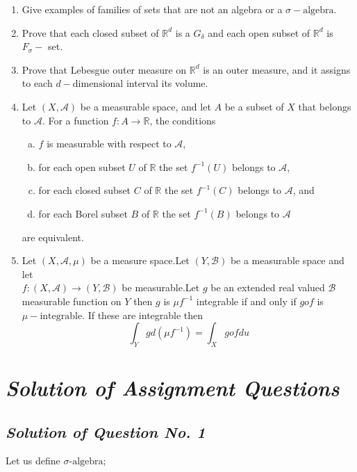 \documentclass[12pt, a4paper]{article} %
\begin{document}
\begin{enumerate}
    \item Give examples of families of sets that are not an algebra or a $\sigma-\mbox{algebra}$.
    \item Prove that each closed subset of $\mathbb{R}^d$ is a $G_{\delta}$ and each open subset of $\mathbb{R}^d$ is $F_{\sigma} - $ set.
    \item Prove that Lebesgue outer measure on $\mathbb{R}^d$ is an outer measure, and it assigns to each $d-\mbox{dimensional}$ interval its volume.
    \item Let $(X, \mathscr{A})$ be a measurable space, and let $A$ be a subset of $X$ that belongs to $\mathscr{A}$. For a function $f:A \to \mathbb{R}$, the conditions 
    \begin{enumerate}[(a)]
        \item $f$ is measurable with respect to $\mathscr{A}$,
        \item for each open subset $U$ of $\mathbb{R}$ the set $f^{-1}(U)$ belongs to $\mathscr{A}$,
        \item for each closed subset $C$ of $\mathbb{R}$ the set $f^{-1}(C)$ belongs to $\mathscr{A}$, and
        \item for each Borel subset $B$ of $\mathbb{R}$ the set $f^{-1}(B)$ belongs to $\mathscr{A}$
    \end{enumerate}
    are equivalent.
    \item Let $(X, \mathscr{A}, \mu)$ be a measure space.Let $(Y, \mathscr{B})$ be a measurable space and let \\
    $f : (X, \mathscr{A}) \to (Y, \mathscr{B})$ be measurable.Let $g$ be an extended real valued $\mathscr{B}$ measurable function on $Y$ then $g$ is $\mu f^{-1}$ integrable if and only if $gof$ is $\mu-\mbox{integrable}$. If these are integrable then \[\int_Y gd(\mu f^{-1}) = \int_X gof du\]
\end{enumerate}

\pagebreak

\section{\slshape Solution of Assignment Questions}

\subsection{\slshape Solution of Question No. 1}

Let us define $\sigma\mbox{-algebra}$; 
\end{document}
